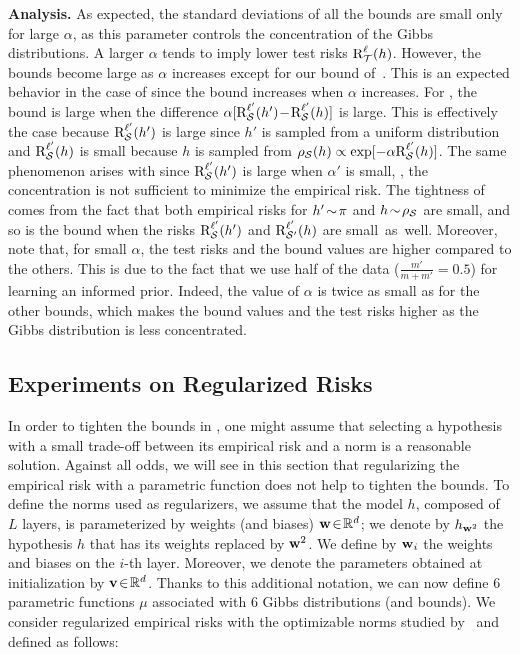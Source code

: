\documentclass[twoside]{article}
\theoremstyle{plain}
\begin{document}
\textbf{Analysis.} As expected, the standard deviations of all the bounds are small only for large $\alpha$, as this parameter controls the concentration of the Gibbs distributions.
A larger $\alpha$ tends to imply lower test risks $\RiskLoss_{\Tcal}(h)$.
However, the bounds become large as $\alpha$ increases except for our bound of~.
This is an expected behavior in the case of  since the bound increases when $\alpha$ increases.
For , the bound is large when the difference $\alpha[\RiskLossp_{\Scal}(h')\!-\!\RiskLossp_{\Scal}(h)]$ is large.
This is effectively the case because $\RiskLossp_{\Scal}(h')$ is large since $h'$ is sampled from a uniform distribution and $\RiskLossp_{\Scal}(h)$ is small because $h$ is sampled from $\AQ(h)\propto \exp[-\alpha\RiskLossp_{\Scal}(h)]$.
The same phenomenon arises with  since $\RiskLossp_{\Scal}(h')$ is large when $\alpha'$ is small, \ie, the concentration is not sufficient to minimize the empirical risk.
The tightness of  comes from the fact that both empirical risks for $h'\!\sim\!\P$ and $h\!\sim\!\AQ$ are small, and so is the bound when the risks $\RiskLossp_{\Scal}(h')$ and $\RiskLossp_{\Scal'}(h)$ are \mbox{small as well}.
Moreover, note that, for small $\alpha$, the test risks and the bound values are higher compared to the others.
This is due to the fact that we use half of the data ($\frac{m'}{m+m'}{=}0.5$) for learning an informed prior.
Indeed, the value of $\alpha$ is twice as small as for the other bounds, which makes the bound values and the test risks higher as the Gibbs distribution is less concentrated.

\subsection{Experiments on Regularized Risks}
\label{sec:experiments-reg-risk}

In order to tighten the bounds in , one might assume that selecting a hypothesis with a small trade-off between its empirical risk and a norm is a reasonable solution. 
Against all odds, we will see in this section that regularizing the empirical risk with a parametric function does not help to tighten the bounds.
To define the norms used as regularizers, we assume that the model $h$, composed of $L$ layers, is parameterized by weights (and biases) $\wbf\!\in\!\R^d$; we denote by $h_{\wbf^2}$ the hypothesis $h$ that has its weights replaced by $\wbf^2$.
We define by $\wbf_i$ the weights and biases on the $i$-th layer.
Moreover, we denote the parameters obtained at initialization by $\vbf\!\in\!\R^d$.
Thanks to this additional notation, we can now define $6$ parametric functions $\mu$ associated with $6$ Gibbs distributions (and bounds).
We consider regularized empirical risks with the optimizable norms studied by~\citet[Sec.C]{jiang2020fantastic} and defined as follows:
\end{document}
